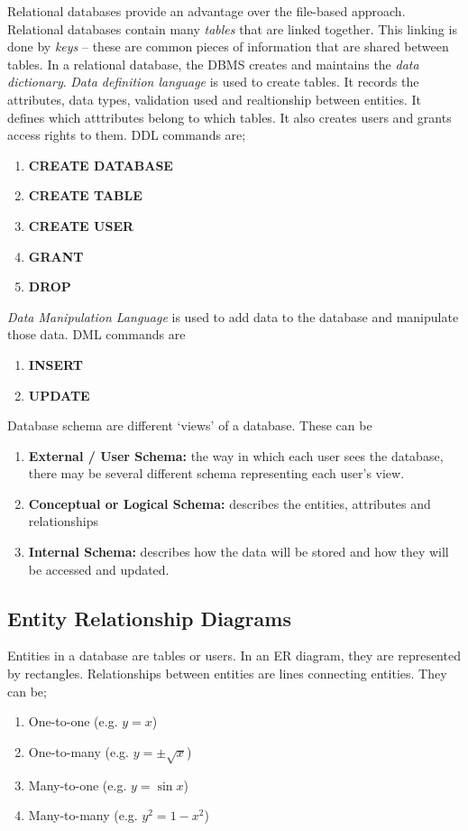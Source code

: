 \documentclass{article}
\begin{document}
\noindent Relational databases provide an advantage over the file-based approach. Relational databases contain many \textit{tables} that are linked together. This linking is done by \textit{keys} -- these are common pieces of information that are shared between tables. In a relational database, the DBMS creates and maintains the \textit{data dictionary}. \textit{Data definition language} is used to create tables. It records the attributes, data types, validation used and realtionship between entities. It defines which atttributes belong to which tables. It also creates users and grants access rights to them. DDL commands are;\begin{enumerate}
    \item \textbf{CREATE DATABASE}
    \item \textbf{CREATE TABLE}
    \item \textbf{CREATE USER}
    \item \textbf{GRANT}
    \item \textbf{DROP}
\end{enumerate}

\noindent \textit{Data Manipulation Language} is used to add data to the database and manipulate those data. DML commands are\begin{enumerate}
    \item \textbf{INSERT}
    \item \textbf{UPDATE}
\end{enumerate}

Database schema are different `views' of a database. These can be\begin{enumerate}
    \item \textbf{External / User Schema:} the way in which each user sees the database, there may be several different schema representing each user's view.
    \item \textbf{Conceptual or Logical Schema:} describes the entities, attributes and relationships
    \item \textbf{Internal Schema:} describes how the data will be stored and how they will be accessed and updated.
\end{enumerate}

\subsection{Entity Relationship Diagrams}

Entities in a database are tables or users. In an ER diagram, they are represented by rectangles. Relationships between entities are lines connecting entities. They can be;\begin{enumerate}
    \item One-to-one (e.g. $y=x$)
    \item One-to-many (e.g. $y=\pm\sqrt x$)
    \item Many-to-one (e.g. $y=\sin x$)
    \item Many-to-many (e.g. $y^2=1-x^2$)
\end{enumerate}
\end{document}
